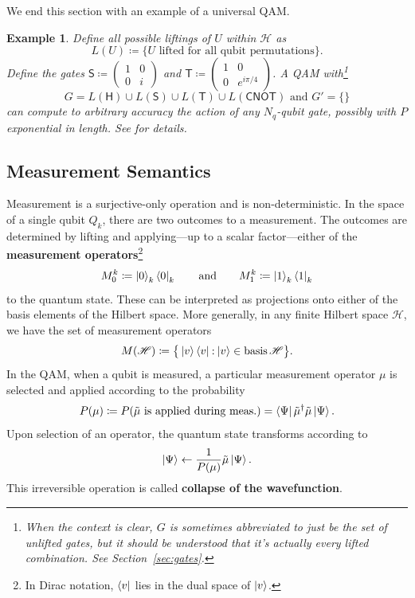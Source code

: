 \documentclass[conference]{IEEEtran}
\newcommand{\defn}[1]{\textbf{#1}}
\newcommand{\CNOT}{\ensuremath{\mathsf{CNOT}}}
\newcommand{\Hil}{\ensuremath{\mathscr{H}}}
\newtheorem{example}{Example}
\begin{document}
We end this section with an example of a universal QAM.
\begin{example}\label{ex:universalqam}
Define all possible liftings of $U$ within $\Hil$ as
\begin{displaymath}
L(U) \coloneqq \{\text{$U$ lifted for all qubit permutations}\}.
\end{displaymath}
Define the gates \(\mathsf{S}\coloneqq
\left(
\begin{smallmatrix}
1 & 0\\
0 & i
\end{smallmatrix}
\right)
\) and \(\mathsf{T}\coloneqq
\left(
\begin{smallmatrix}
1 & 0\\
0 & e^{i\pi/4}
\end{smallmatrix}
\right)
\). A QAM with\footnote{When the context is clear, $G$ is sometimes abbreviated to just be the set of unlifted gates, but it should be understood that it's actually every lifted combination. See Section~\ref{sec:gates}.} \[G=L(\mathsf{H})\cup L(\mathsf{S})\cup L(\mathsf{T})\cup L(\CNOT) \text{ and } G'=\{\}\] can compute to arbitrary accuracy the action of any $N_q$-qubit gate, possibly with $P$ exponential in length. See \cite[\S4.5]{nielsen2010quantum} for details.
\end{example}

\subsection{Measurement Semantics}\label{sec:measurementsemantics}
Measurement is a surjective-only operation and is non-deterministic. In the space of a single qubit $Q_k$, there are two outcomes to a measurement. The outcomes are determined by lifting and applying---up to a scalar factor---either of the \defn{measurement operators}\footnote{In Dirac notation, $\bra{v}$ lies in the dual space of $\ket{v}$.}
\begin{equation*}
M_0^k \coloneqq \ket{0}_k\bra{0}_k \qquad\text{and}\qquad  M_1^k \coloneqq \ket{1}_k\bra{1}_k
\end{equation*}
to the quantum state. These can be interpreted as projections onto either of the basis elements of the Hilbert space. More generally, in any finite Hilbert space $\Hil$, we have the set of measurement operators \[M(\Hil) \coloneqq \big\{\ket{v}\bra{v} \mathbin{:} \ket{v}\in\operatorname{basis} \Hil\big\}.\] In the QAM, when a qubit is measured, a particular measurement operator $\mu$ is selected and applied according to the probability
\begin{equation}
P(\mu) \coloneqq P(\text{$\tilde\mu$ is applied during meas.}) = \bra{\Psi} \tilde\mu^{\dagger}\tilde\mu\ket{\Psi}.
\end{equation}
Upon selection of an operator, the quantum state transforms according to
\begin{equation}
\ket{\Psi} \leftarrow \frac{1}{P(\mu)}\tilde\mu\ket{\Psi}.
\end{equation}
This irreversible operation is called \defn{collapse of the wavefunction}.
\end{document}
